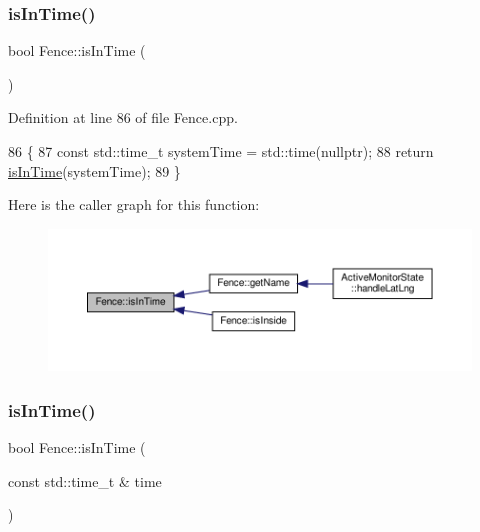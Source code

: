 \subsubsection{\texorpdfstring{is\+In\+Time()}{isInTime()}\hspace{0.1cm}{\footnotesize\ttfamily [1/2]}}
{\footnotesize\ttfamily bool Fence\+::is\+In\+Time (\begin{DoxyParamCaption}{ }\end{DoxyParamCaption})}



Definition at line 86 of file Fence.\+cpp.


\begin{DoxyCode}
86                      \{
87     \textcolor{keyword}{const} std::time\_t systemTime = std::time(\textcolor{keyword}{nullptr});
88     \textcolor{keywordflow}{return} \hyperlink{class_fence_a7695b0f94f461369703188a287a38ab4}{isInTime}(systemTime);
89 \}
\end{DoxyCode}
Here is the caller graph for this function\+:\nopagebreak
\begin{figure}[H]
\begin{center}
\leavevmode
\includegraphics[width=350pt]{d0/db8/class_fence_a7695b0f94f461369703188a287a38ab4_icgraph}
\end{center}
\end{figure}
\mbox{\label{class_fence_a9d1d90f134dceb2168247cd8454d91f4}} 
\subsubsection{\texorpdfstring{is\+In\+Time()}{isInTime()}\hspace{0.1cm}{\footnotesize\ttfamily [2/2]}}
{\footnotesize\ttfamily bool Fence\+::is\+In\+Time (\begin{DoxyParamCaption}\item[{const std\+::time\+\_\+t \&}]{time }\end{DoxyParamCaption})}



